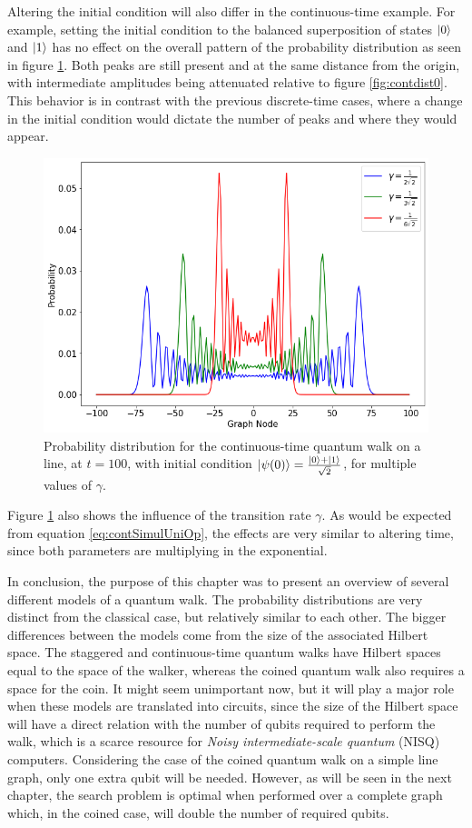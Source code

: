 \documentclass[../../dissertation.tex]{subfiles}
\begin{document}
Altering the initial condition will also differ in the
continuous-time example. For example, setting the initial condition to the
balanced superposition of states $\ket{0}$ and $\ket{1}$ has no effect on the
overall pattern of the probability distribution as seen in figure
\ref{fig:contdist2}. Both peaks are still present and at the same
distance from the origin, with intermediate amplitudes being attenuated
relative to figure \ref{fig:contdist0}. This behavior is in contrast with the previous
discrete-time cases, where a change in the initial condition would dictate the
number of peaks and where they would appear.
\begin{figure}[!h]
	\centering
	\includegraphics[scale=0.40]{img/ContQuantumWalk/ctqwMultipleGammaSup.png}
	\caption{Probability distribution for the continuous-time quantum walk on a line, at $t=100$, with initial condition $\ket{\psi(0)}=\frac{\ket{0}+\ket{1}}{\sqrt{2}}$, for multiple values of $\gamma$.} 
	\label{fig:contdist2}
\end{figure}
Figure \ref{fig:contdist2} also shows the influence of the transition rate
$\gamma$. As would be expected from equation \eqref{eq:contSimulUniOp}, the
effects are very similar to altering time, since both parameters are
multiplying in the exponential.\par

In conclusion, the purpose of this chapter was to present an overview of
several different models of a quantum walk. The probability distributions are
very distinct from the classical case, but relatively similar to each other.
The bigger differences between the models come from the size of the associated
Hilbert space. The staggered and continuous-time quantum walks have
Hilbert spaces equal to the space of the walker, whereas the coined
quantum walk also requires a space for the coin. It might seem unimportant now,
but it will play a major role when these models are translated into circuits,
since the size of the Hilbert space will have a direct relation with the number
of qubits required to perform the walk, which is a scarce resource for
\textit{Noisy intermediate-scale quantum} (NISQ) computers. Considering the
case of the coined quantum walk on a simple line graph, only one extra qubit
will be needed. However, as will be seen in the next chapter, the search problem is
optimal when performed over a complete graph which, in the coined case, will
double the number of required qubits. 
\end{document}
